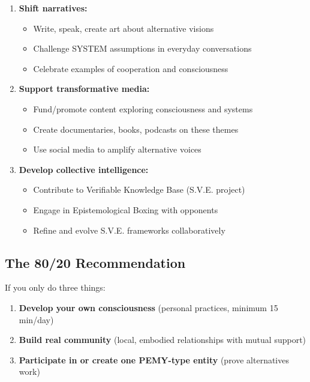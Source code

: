 \documentclass[11pt,a4paper]{article}
\theoremstyle{definition}
\theoremstyle{remark}
\begin{document}
\begin{enumerate}
    \item \textbf{Shift narratives:}
    \begin{itemize}
        \item Write, speak, create art about alternative visions
        \item Challenge SYSTEM assumptions in everyday conversations
        \item Celebrate examples of cooperation and consciousness
    \end{itemize}
    
    \item \textbf{Support transformative media:}
    \begin{itemize}
        \item Fund/promote content exploring consciousness and systems
        \item Create documentaries, books, podcasts on these themes
        \item Use social media to amplify alternative voices
    \end{itemize}
    
    \item \textbf{Develop collective intelligence:}
    \begin{itemize}
        \item Contribute to Verifiable Knowledge Base (S.V.E. project)
        \item Engage in Epistemological Boxing with opponents
        \item Refine and evolve S.V.E. frameworks collaboratively
    \end{itemize}
\end{enumerate}

\subsection{The 80/20 Recommendation}

If you only do three things:

\begin{enumerate}
    \item \textbf{Develop your own consciousness} (personal practices, minimum 15 min/day)
    \item \textbf{Build real community} (local, embodied relationships with mutual support)
    \item \textbf{Participate in or create one PEMY-type entity} (prove alternatives work)
\end{enumerate}
\end{document}
